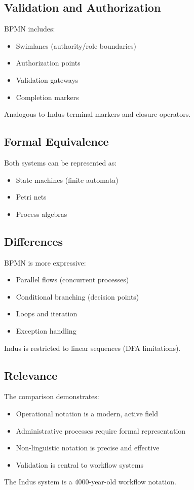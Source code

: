 \subsection{Validation and Authorization}

BPMN includes:
\begin{itemize}
    \item Swimlanes (authority/role boundaries)
    \item Authorization points
    \item Validation gateways
    \item Completion markers
\end{itemize}

Analogous to Indus terminal markers and closure operators.

\subsection{Formal Equivalence}

Both systems can be represented as:
\begin{itemize}
    \item State machines (finite automata)
    \item Petri nets
    \item Process algebras
\end{itemize}

\subsection{Differences}

BPMN is more expressive:
\begin{itemize}
    \item Parallel flows (concurrent processes)
    \item Conditional branching (decision points)
    \item Loops and iteration
    \item Exception handling
\end{itemize}

Indus is restricted to linear sequences (DFA limitations).

\subsection{Relevance}

The comparison demonstrates:
\begin{itemize}
    \item Operational notation is a modern, active field
    \item Administrative processes require formal representation
    \item Non-linguistic notation is precise and effective
    \item Validation is central to workflow systems
\end{itemize}

The Indus system is a 4000-year-old workflow notation.
